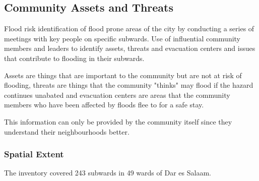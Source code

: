 \documentclass[a4paper,12pt,twoside]{article}
\begin{document}
\newpage

\subsection{Community Assets and Threats}

\begin{multicols}{2}
Flood risk identification of flood prone areas of the city by conducting a series of meetings with key people on specific subwards. 
Use of influential community members and leaders to identify assets, threats and evacuation centers  and issues that contribute to flooding in their subwards. 

Assets are things that are important to the community but are not at risk of flooding, threats are things that the community "thinks" may flood if the hazard continues unabated and evacuation centers are areas that the community members who have been affected by floods flee to for a safe stay.

This information can only be provided by the community itself since they understand their neighbourhoods better.

\end{multicols}

\subsubsection{Spatial Extent}
The inventory covered  243 subwards in 49 wards of Dar es Salaam.
\end{document}
